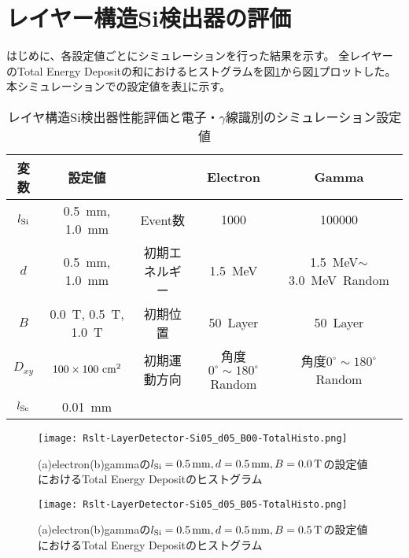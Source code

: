 \documentclass[a4paper,10pt]{jreport}
\begin{document}
\section{レイヤー構造Si検出器の評価}

はじめに、各設定値ごとにシミュレーションを行った結果を示す。
全レイヤーのTotal Energy Depositの和におけるヒストグラムを図\ref{Rslt-LayerDetector-Si05_d05_B00-TotalHisto}から図\ref{Rslt-LayerDetector-Si05_d05_B00-TotalHisto}プロットした。
本シミュレーションでの設定値を表\ref{Tab-LayerDetectorDpendence}に示す。

\begin{table}[H] 
	\center
	\caption{レイヤ構造Si検出器性能評価と電子・$\gamma$線識別のシミュレーション設定値} \label{Tab-LayerDetectorDpendence}
	\begin{tabular}{|cc||c|cc|}
		\hline
		変数 & 設定値 & & Electron & Gamma\\
		\hline
		$l_{\rm{Si}}$ &  \SI{0.5}{mm}, \SI{1.0}{mm} &Event数 & 1000 & 100000 \\ 
		$d$ & \SI{0.5}{mm}, \SI{1.0}{mm} & 初期エネルギー &
		 \SI{1.5}{MeV} & \SI{1.5}{MeV}$\sim$\SI{3.0}{MeV}\ Random \\
		$B$ & \SI{0.0}{T}, \SI{0.5}{T}, \SI{1.0}{T} & 初期位置 & \SI{50}{Layer} & \SI{50}{Layer} \\
		$D_{xy}$ & $100\times100\ \rm{cm}^2$ & 初期運動方向 & 
		角度$0^{\circ}\sim180^{\circ}$Random & 角度$0^{\circ}\sim180^{\circ}$Random \\
		$l_{\rm{Se}}$ & \SI{0.01}{mm} & & & \\
		\hline
	\end{tabular}
\end{table}

\begin{figure}[H]
	\center
	\texttt{[image: Rslt-LayerDetector-Si05\_d05\_B00-TotalHisto.png]}
	\caption{(a)electron(b)gammaの$l_{\rm{Si}}=\SI{0.5}{mm}, d=\SI{0.5}{mm}, B=\SI{0.0}{T}$の設定値におけるTotal Energy Depositのヒストグラム}
	\label{Rslt-LayerDetector-Si05_d05_B00-TotalHisto}
\end{figure}

\begin{figure}[H]
	\center
	\texttt{[image: Rslt-LayerDetector-Si05\_d05\_B05-TotalHisto.png]}
	\caption{(a)electron(b)gammaの$l_{\rm{Si}}=\SI{0.5}{mm}, d=\SI{0.5}{mm}, B=\SI{0.5}{T}$の設定値におけるTotal Energy Depositのヒストグラム}
	\label{Rslt-LayerDetector-Si05_d05_B05-TotalHisto}
\end{figure}
\end{document}
